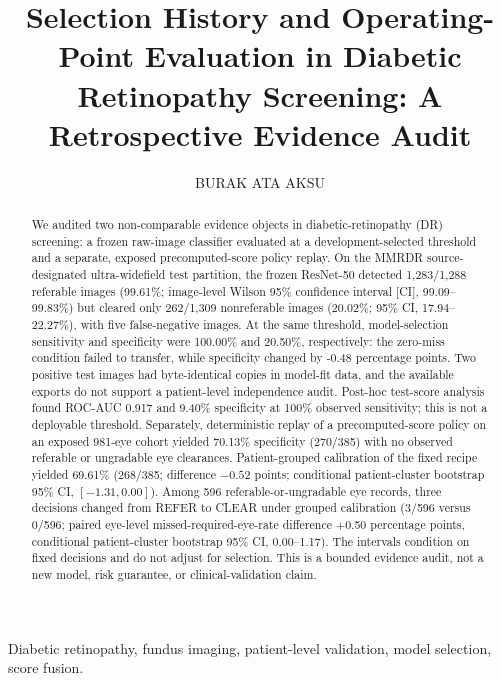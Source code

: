 \documentclass{ieeeaccess}
\title{Selection History and Operating-Point Evaluation in Diabetic Retinopathy Screening: A Retrospective Evidence Audit}
\author{\uppercase{Burak Ata Aksu}}
\begin{document}
\begin{abstract}
We audited two non-comparable evidence objects in diabetic-retinopathy (DR) screening: a frozen raw-image classifier evaluated at a development-selected threshold and a separate, exposed precomputed-score policy replay. On the MMRDR source-designated ultra-widefield test partition, the frozen ResNet-50 detected 1,283/1,288 referable images (99.61\%; image-level Wilson 95\% confidence interval [CI], 99.09--99.83\%) but cleared only 262/1,309 nonreferable images (20.02\%; 95\% CI, 17.94--22.27\%), with five false-negative images. At the same threshold, model-selection sensitivity and specificity were 100.00\% and 20.50\%, respectively: the zero-miss condition failed to transfer, while specificity changed by -0.48 percentage points. Two positive test images had byte-identical copies in model-fit data, and the available exports do not support a patient-level independence audit. Post-hoc test-score analysis found ROC-AUC 0.917 and 9.40\% specificity at 100\% observed sensitivity; this is not a deployable threshold. Separately, deterministic replay of a precomputed-score policy on an exposed 981-eye cohort yielded 70.13\% specificity (270/385) with no observed referable or ungradable eye clearances. Patient-grouped calibration of the fixed recipe yielded 69.61\% (268/385; difference $-0.52$ points; conditional patient-cluster bootstrap 95\% CI, $[-1.31,0.00]$). Among 596 referable-or-ungradable eye records, three decisions changed from REFER to CLEAR under grouped calibration (3/596 versus 0/596; paired eye-level missed-required-eye-rate difference +0.50 percentage points, conditional patient-cluster bootstrap 95\% CI, 0.00--1.17). The intervals condition on fixed decisions and do not adjust for selection. This is a bounded evidence audit, not a new model, risk guarantee, or clinical-validation claim.
\end{abstract}

\begin{keywords}
Diabetic retinopathy, fundus imaging, patient-level validation, model selection, score fusion.
\end{keywords}
\titlepgskip=-21pt
\maketitle
\end{document}
